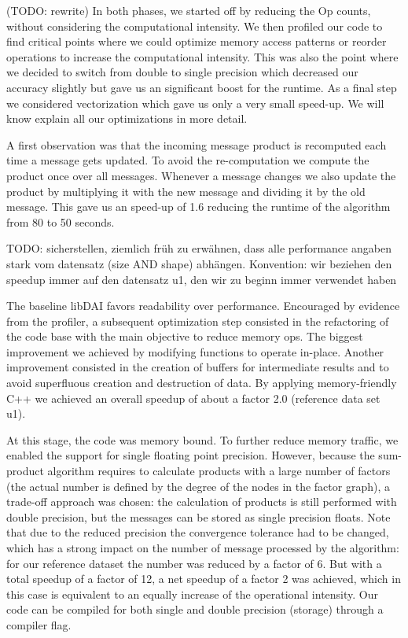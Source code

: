 (TODO: rewrite) 
In both phases, we started off by reducing the Op counts, without considering the computational intensity. We then profiled our code to find critical points where we could optimize memory access patterns or reorder operations to increase the computational intensity. This was also the point where we decided to switch from double to single precision which decreased our accuracy slightly but gave us an significant boost for the runtime. %
As a final step we considered vectorization which gave us only a very small speed-up. We will know explain all our optimizations in more detail.
 
A first observation was that the incoming message product is recomputed each time a message gets updated. To avoid the re-computation we compute the product once over all messages. Whenever a message changes we also update the product by multiplying it with the new message and dividing it by the old message. This gave us an speed-up of 1.6 reducing the runtime of the algorithm from 80 to 50 seconds.

TODO: sicherstellen, ziemlich früh zu erwähnen, dass alle performance angaben stark vom datensatz (size AND shape) abhängen. Konvention: wir beziehen den speedup immer auf den datensatz u1, den wir zu beginn immer verwendet haben

The baseline libDAI favors readability over performance. Encouraged by evidence from the profiler, a subsequent optimization step consisted in the refactoring of the code base with the main objective to reduce memory ops. The biggest improvement we achieved by modifying functions to operate in-place. Another improvement consisted in the creation of buffers for intermediate results and to avoid superfluous creation and destruction of data. 
By applying memory-friendly C++ we achieved an overall speedup of about a factor 2.0 (reference data set u1).

At this stage, the code was memory bound. To further reduce memory traffic, we enabled the support for single floating point precision. However, because the sum-product algorithm requires to calculate products with a large number of factors (the actual number is defined by the degree of the nodes in the factor graph), a trade-off approach was chosen: the calculation of products is still performed with double precision, but the messages can be stored as single precision floats. Note that due to the reduced precision the convergence tolerance had to be changed, which has a strong impact on the number of message processed by the algorithm: for our reference dataset the number was reduced by a factor of 6. But with a total speedup of a factor of 12, a net speedup of a factor 2 was achieved, which in this case is equivalent to an equally increase of the operational intensity. Our code can be compiled for both single and double precision (storage) through a compiler flag.

